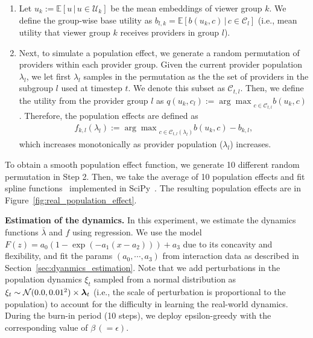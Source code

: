 \begin{enumerate}
    \item Let $u_k := \mathbb{E}[u \,|\, u \in \mathcal{U}_k]$ be the mean embeddings of viewer group $k$. We define the group-wise base utility as $b_{l,k} = \mathbb{E}[b(u_k,c) \,|\, c \in\mathcal{C}_l]$ (i.e.,  mean utility that viewer group $k$ receives providers in group $l$).
    \item Next, to simulate a population effect, we generate a random permutation of providers within each provider group. Given the current provider population $\lambda_l$, we  let first $\lambda_l$ samples in the permutation as the the set of providers in the subgroup $l$ used at timestep $t$. We denote this subset as $\mathcal{C}_{t,l}$.
    Then, we define the utility from the provider group $l$ as $q(u_k, c_l) := {\arg\max}_{c \in \mathcal{C}_{t,l}} b(u_k,c)$. Therefore, the population effects are defined as 
    \begin{align*}
        f_{k,l}(\lambda_l) := {\arg\max}_{c \in \mathcal{C}_{t,l}(\lambda_l)} b(u_k,c) - b_{k,l},
    \end{align*}
    which increases monotonically as provider population ($\lambda_l$) increases. 
\end{enumerate}
To obtain a smooth population effect function,
we generate 10 different random permutation in Step 2. Then, we take the average of 10 population effects and fit spline functions~\citep{reinsch1967smoothing} implemented in SciPy~\citep{virtanen2020scipy}. The resulting population effects are in Figure~\ref{fig:real_population_effect}.

\textbf{Estimation of the dynamics.} \; In this experiment, we estimate the dynamics functions $\bar{\lambda}$ and $f$ using regression. 
We use the model $F(z) = a_0 (1 - \exp(- a_1 (x - a_2))) + a_3$ due to its concavity and flexibility, and fit the params $(a_0, \cdots, a_3)$
from interaction data as described in Section~\ref{sec:dyanmics_estimation}. 
Note that we add perturbations in the population dynamics $\xi_t$ sampled from a normal distribution as $\xi_t \sim \mathcal{N}(0.0, 0.01^2) \times \bm{\lambda}_t$ (i.e., the scale of perturbation is proportional to the population) to account for the difficulty in learning the real-world dynamics. During the burn-in period (10 steps), we deploy epsilon-greedy with the corresponding value of $\beta \, (= \epsilon)$. 

